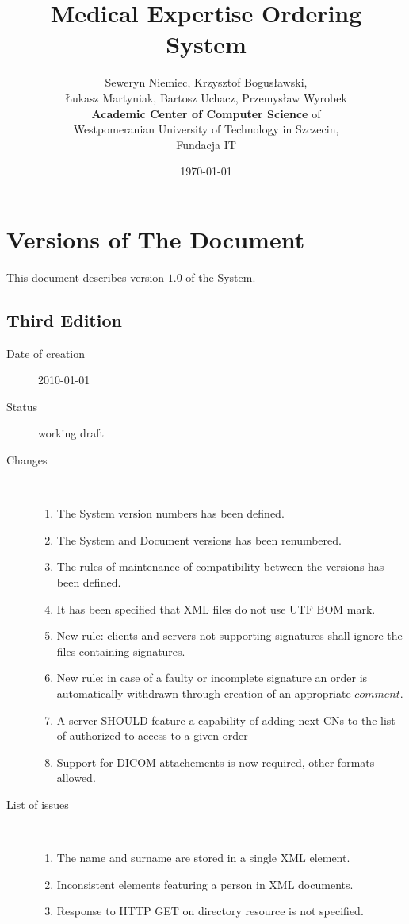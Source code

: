 \documentclass[a4paper]{article}
\begin{document}
\title{Medical Expertise Ordering System}
\author{Seweryn Niemiec, Krzysztof Bogusławski,\\ 
Łukasz Martyniak, Bartosz Uchacz, Przemysław Wyrobek \\ 
\textbf{Academic Center of Computer Science } of \\ 
Westpomeranian University of Technology in Szczecin,\\
Fundacja IT}
\date{\today}
\maketitle
\tableofcontents
\listoffigures
\listoftables

\section{Versions of The Document}

This document describes version $1.0$ of the System.

\subsection{Third Edition}
\begin{description}
  \item[Date of creation] 2010-01-01
  \item[Status] working draft
  \item[Changes] \hfill \\
	\begin{enumerate}
      \item The System version numbers has been defined.
      \item The System and Document versions has been renumbered.
      \item The rules of maintenance of compatibility between the versions has been defined.
	  \item It has been specified that XML files do not use UTF BOM mark.
      \item New rule: clients and servers not supporting signatures shall 
		ignore the files containing signatures.
      \item New rule: in case of a faulty or incomplete signature an order is 
		automatically withdrawn through creation of an appropriate $comment$.
      \item A server SHOULD feature a capability of adding next CNs to the 
		list of authorized to access to a given order
      \item Support for DICOM attachements is now required, other formats allowed.
	\end{enumerate}
  \item[List of issues] \hfill \\
	\begin{enumerate}
      \item The name and surname are stored in a single XML element.
      \item Inconsistent elements featuring a person in XML documents.
	  \item Response to HTTP GET on directory resource is not specified.
	\end{enumerate}
\end{description}
\end{document}
